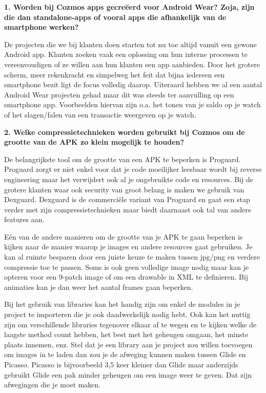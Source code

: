 \begin{appendices}
	\textbf{1. Worden bij Cozmos apps gecreëerd voor Android Wear? Zoja, zijn die dan standalone-apps of vooral apps die afhankelijk van de smartphone werken?}
	
	De projecten die we bij klanten doen starten tot nu toe altijd vanuit een gewone Android app. Klanten zoeken vaak een oplossing om hun interne processen te vereenvoudigen of ze willen aan hun klanten een app aanbieden.
	Door het grotere scherm, meer rekenkracht en simpelweg het feit dat bijna iedereen een smartphone bezit ligt de focus volledig daarop. Uiteraard hebben we al een aantal Android Wear projecten gehad maar dit was steeds ter aanvulling op een smartphone app. Voorbeelden hiervan zijn o.a. het tonen van je saldo op je watch of het slagen/falen van een transactie weergeven op je watch.
	
	\textbf{2. Welke compressietechnieken worden gebruikt bij Cozmos om de grootte van de APK zo klein mogelijk te houden?}
	
	De belangrijkste tool om de grootte van een APK te beperken is Proguard. Proguard zorgt er niet enkel voor dat je code moeilijker leesbaar wordt bij reverse engineering maar het verwijdert ook al je ongebruikte code en resources.
	Bij de grotere klanten waar ook security van groot belang is maken we gebruik van Dexguard. Dexguard is de commerciële variant van Proguard en gaat een stap verder met zijn compressietechnieken maar biedt daarnaast ook tal van andere features aan.
	
	Eén van de andere manieren om de grootte van je APK te gaan beperken is kijken naar de manier waarop je images en andere resources gaat gebruiken. Je kan al ruimte besparen door een juiste keuze te maken tussen jpg/png en verdere compressie toe te passen. Soms is ook geen volledige image nodig maar kan je opteren voor een 9-patch image of om een drawable in XML te definieren. Bij animaties kan je dan weer het aantal frames gaan beperken.
	
	Bij het gebruik van libraries kan het handig zijn om enkel de modules in je project te importeren die je ook daadwerkelijk nodig hebt. Ook kan het nuttig zijn om verschillende libraries tegenover elkaar af te wegen en te kijken welke de laagste method count hebben, het best met het geheugen omgaan, het minste plaats innemen, enz. Stel dat je een library aan je project zou willen toevoegen om images in te laden dan zou je de afweging kunnen maken tussen Glide en Picasso. Picasso is bijvoorbeeld 3,5 keer kleiner dan Glide maar anderzijds gebruikt Glide een pak minder geheugen om een image weer te geven. Dat zijn afwegingen die je moet maken.
	

\end{appendices}
